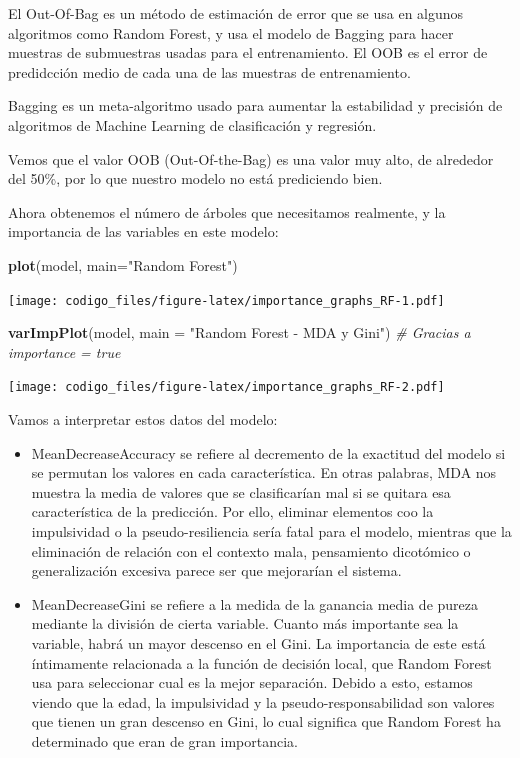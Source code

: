 \documentclass[]{article}
\newenvironment{Shaded}{\begin{snugshade}}{\end{snugshade}}
\newcommand{\KeywordTok}[1]{\textcolor[rgb]{0.13,0.29,0.53}{\textbf{#1}}}
\newcommand{\DataTypeTok}[1]{\textcolor[rgb]{0.13,0.29,0.53}{#1}}
\newcommand{\StringTok}[1]{\textcolor[rgb]{0.31,0.60,0.02}{#1}}
\newcommand{\CommentTok}[1]{\textcolor[rgb]{0.56,0.35,0.01}{\textit{#1}}}
\newcommand{\NormalTok}[1]{#1}
\begin{document}
El Out-Of-Bag es un método de estimación de error que se usa en algunos
algoritmos como Random Forest, y usa el modelo de Bagging para hacer
muestras de submuestras usadas para el entrenamiento. El OOB es el error
de predidcción medio de cada una de las muestras de entrenamiento.

Bagging es un meta-algoritmo usado para aumentar la estabilidad y
precisión de algoritmos de Machine Learning de clasificación y
regresión.

Vemos que el valor OOB (Out-Of-the-Bag) es una valor muy alto, de
alrededor del 50\%, por lo que nuestro modelo no está prediciendo bien.

Ahora obtenemos el número de árboles que necesitamos realmente, y la
importancia de las variables en este modelo:

\begin{Shaded}
\begin{Highlighting}[]
\KeywordTok{plot}\NormalTok{(model, }\DataTypeTok{main=}\StringTok{"Random Forest"}\NormalTok{)}
\end{Highlighting}
\end{Shaded}

\texttt{[image: codigo\_files/figure-latex/importance\_graphs\_RF-1.pdf]}

\begin{Shaded}
\begin{Highlighting}[]
\KeywordTok{varImpPlot}\NormalTok{(model, }\DataTypeTok{main =} \StringTok{"Random Forest - MDA y Gini"}\NormalTok{) }\CommentTok{# Gracias a importance = true}
\end{Highlighting}
\end{Shaded}

\texttt{[image: codigo\_files/figure-latex/importance\_graphs\_RF-2.pdf]}

Vamos a interpretar estos datos del modelo:

\begin{itemize}
\item
  MeanDecreaseAccuracy se refiere al decremento de la exactitud del
  modelo si se permutan los valores en cada característica. En otras
  palabras, MDA nos muestra la media de valores que se clasificarían mal
  si se quitara esa característica de la predicción. Por ello, eliminar
  elementos coo la impulsividad o la pseudo-resiliencia sería fatal para
  el modelo, mientras que la eliminación de relación con el contexto
  mala, pensamiento dicotómico o generalización excesiva parece ser que
  mejorarían el sistema.
\item
  MeanDecreaseGini se refiere a la medida de la ganancia media de pureza
  mediante la división de cierta variable. Cuanto más importante sea la
  variable, habrá un mayor descenso en el Gini. La importancia de este
  está íntimamente relacionada a la función de decisión local, que
  Random Forest usa para seleccionar cual es la mejor separación. Debido
  a esto, estamos viendo que la edad, la impulsividad y la
  pseudo-responsabilidad son valores que tienen un gran descenso en
  Gini, lo cual significa que Random Forest ha determinado que eran de
  gran importancia.
\end{itemize}
\end{document}
